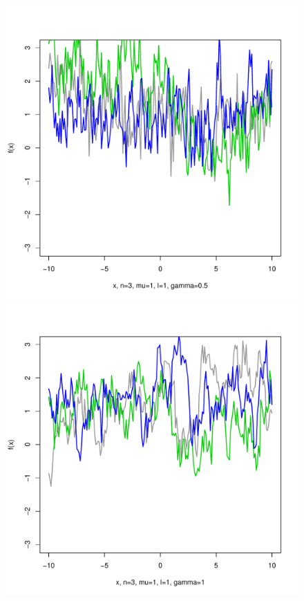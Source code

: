 \documentclass[12pt,letterpaper]{article}
\begin{document}
\begin{figure}
\begin{center}
\includegraphics[scale=0.2]{hw321/n3-m1-l1-g1.pdf}
\includegraphics[scale=0.2]{hw321/n3-m1-l1-g2.pdf}

\end{center}
\end{figure}
\end{document}

